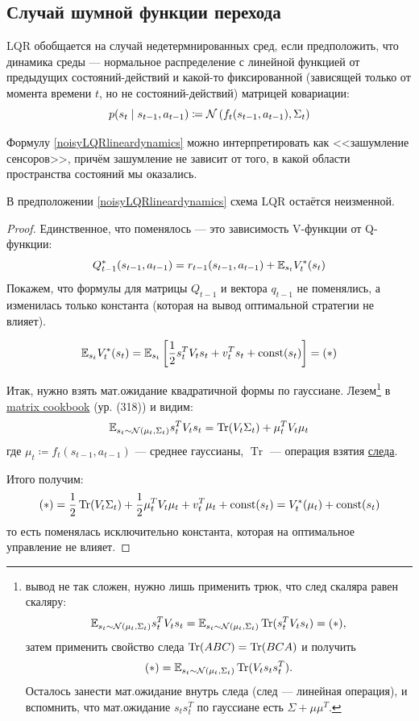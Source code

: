 \subsection{Случай шумной функции перехода}

LQR обобщается на случай недетермнированных сред, если предположить, что динамика среды --- нормальное распределение с линейной функцией от предыдущих состояний-действий и какой-то фиксированной (зависящей только от момента времени $t$, но не состояний-действий) матрицей ковариации:
\begin{equation}\label{noisyLQRlineardynamics}
p(s_{t} \mid s_{t-1}, a_{t-1}) \coloneqq \mathcal{N} \left( f_t(s_{t-1}, a_{t-1}), \Sigma_t \right) 
\end{equation}

Формулу \eqref{noisyLQRlineardynamics} можно интерпретировать как <<зашумление сенсоров>>, причём зашумление не зависит от того, в какой области пространства состояний мы оказались.

\begin{theorem}
В предположении \eqref{noisyLQRlineardynamics} схема LQR остаётся неизменной.
\begin{proof}
Единственное, что поменялось --- это зависимость V-функции от Q-функции:
$$Q^*_{t-1}(s_{t-1}, a_{t-1}) = r_{t-1}(s_{t-1}, a_{t-1}) + \mathbb{E}_{s_t} V_t^*(s_t)$$
Покажем, что формулы для матрицы $Q_{t-1}$ и вектора $q_{t-1}$ не поменялись, а изменилась только константа (которая на вывод оптимальной стратегии не влияет).

$$\mathbb{E}_{s_t} V^*_t(s_t) = \mathbb{E}_{s_t} \left[ \frac{1}{2} s_t^TV_ts_t + v_t^T s_t + \operatorname{const}(s_t) \right] = (*)$$

Итак, нужно взять мат.ожидание квадратичной формы по гауссиане. Лезем\footnote{вывод не так сложен, нужно лишь применить трюк, что след скаляра равен скаляру: $$\mathbb{E}_{s_t \sim \mathcal{N}(\mu_t, \Sigma_t)} s_t^TV_ts_t = \mathbb{E}_{s_t \sim \mathcal{N}(\mu_t, \Sigma_t)} \operatorname{Tr}(s_t^TV_ts_t) = (*),$$ затем применить свойство следа $\operatorname{Tr}(ABC) = \operatorname{Tr}(BCA)$ и получить $$(*) = \mathbb{E}_{s_t \sim \mathcal{N}(\mu_t, \Sigma_t)} \operatorname{Tr}(V_ts_ts_t^T).$$ Осталось занести мат.ожидание внутрь следа (след --- линейная операция), и вспомнить, что мат.ожидание $s_t s_t^T$ по гауссиане есть $\Sigma + \mu \mu^T$.} в \href{https://www.math.uwaterloo.ca/~hwolkowi/matrixcookbook.pdf}{matrix cookbook} (ур. (318)) и видим:
$$\mathbb{E}_{s_t \sim \mathcal{N}(\mu_t, \Sigma_t)} s_t^TV_ts_t = \operatorname{Tr}(V_t \Sigma_t) + \mu_t^TV_t\mu_t$$
где $\mu_t \coloneqq f_t(s_{t-1}, a_{t-1})$ --- среднее гауссианы, $\operatorname{Tr}$ --- операция взятия \href{https://ru.wikipedia.org/wiki/\%D0\%A1\%D0\%BB\%D0\%B5\%D0\%B4_\%D0\%BC\%D0\%B0\%D1\%82\%D1\%80\%D0\%B8\%D1\%86\%D1\%8B}{следа}.

Итого получим:
$$(*) = \frac{1}{2} \operatorname{Tr}(V_t \Sigma_t) + \frac{1}{2} \mu_t^TV_t\mu_t + v_t^T \mu_t + \operatorname{const}(s_t) = V^*_t(\mu_t) + \operatorname{const}(s_t)$$
то есть поменялась исключительно константа, которая на оптимальное управление не влияет.
\end{proof}
\end{theorem}


